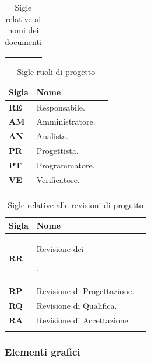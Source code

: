 {{\begin{longtable}{L{.1\freewidth} L{.25\freewidth} L{.080\freewidth}}
		\bottomrule
		\hiderowcolors
		\caption{Sigle relative ai nomi dei documenti}
	\end{longtable}
	\newpage{}
	\setlength{\freewidth}{\dimexpr\textwidth-1\tabcolsep}
	\renewcommand{\arraystretch}{1.5}
	\setlength{\aboverulesep}{0pt}
	\setlength{\belowrulesep}{0pt}
	\begin{longtable}{L{.1\freewidth} L{.25\freewidth} L{.080\freewidth}}
		\textbf{Sigla} & \textbf{Nome} \\
		\toprule
		\endhead		
		 \textbf{RE}& Responsabile. \\
		 \textbf{AM} & Amministratore. \\
		 \textbf{AN} & Analista. \\
		 \textbf{PR} & Progettista. \\
		 \textbf{PT} & Programmatore. \\
		 \textbf{VE} & Verificatore. \\

		\bottomrule
		\hiderowcolors
		\caption{Sigle ruoli di progetto}
	\end{longtable}
		
		\setlength{\freewidth}{\dimexpr\textwidth-1\tabcolsep}
	\renewcommand{\arraystretch}{1.5}
	\setlength{\aboverulesep}{0pt}
	\setlength{\belowrulesep}{0pt}
	\begin{longtable}{L{.1\freewidth} L{.3\freewidth} L{.080\freewidth}}
		\textbf{Sigla} & \textbf{Nome} \\
		\toprule
		\endhead		
		 \textbf{RR}& Revisione dei . \\
		 \textbf{RP} & Revisione di Progettazione. \\
		 \textbf{RQ} & Revisione di Qualifica. \\
		 \textbf{RA} & Revisione di Accettazione. \\
		 

		\bottomrule
		\hiderowcolors
		\caption{Sigle relative alle revisioni di progetto}
	\end{longtable}	

\subsubsection*{Elementi grafici}

}}
